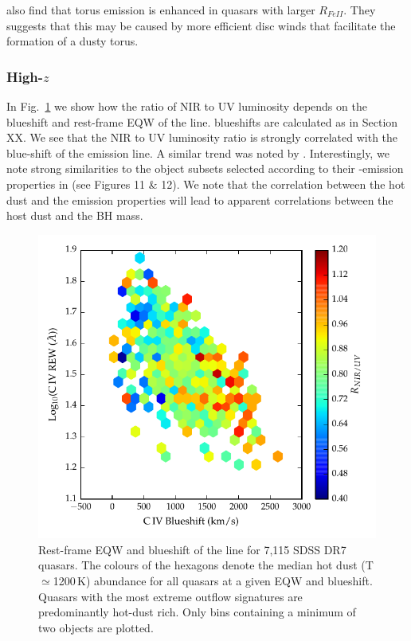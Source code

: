 \citet{shen14} also find that torus emission is enhanced in quasars with larger $R_{FeII}$.
They suggests that this may be caused by more efficient disc winds that facilitate the formation of a dusty torus. 

\subsubsection{High-$z$}

In Fig.~\ref{fig:civ_hot_dust} we show how the ratio of \ac{NIR} to UV luminosity depends on the blueshift and rest-frame \ac{EQW} of the  line.
 blueshifts are calculated as in Section XX. 
We see that the \ac{NIR} to UV luminosity ratio is strongly correlated with the blue-shift of the  emission line. 
A similar trend was noted by \citet{wang13}. 
Interestingly, we note strong similarities to the object subsets selected according to their -emission properties in \citet{richards11} (see Figures 11 \& 12).  
We note that the correlation between the hot dust and the  emission properties will lead to apparent correlations between the host dust and the BH mass. 
 
\begin{figure}
\centering
  \includegraphics[width=\columnwidth]{figures/chapter05/hot_dust_ratio.pdf}
  \caption{Rest-frame \ac{EQW} and blueshift of the  line for 7,115 SDSS DR7 quasars. The colours of the hexagons denote the median hot dust (T$\simeq$1200\,K) abundance for all quasars at a given \ac{EQW} and blueshift. Quasars with the most extreme outflow signatures are predominantly hot-dust rich. Only bins containing a minimum of two objects are plotted.}
  \label{fig:civ_hot_dust}
\end{figure}

